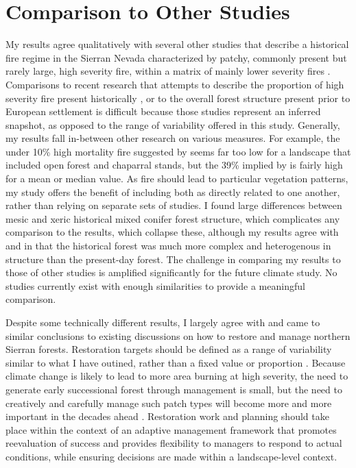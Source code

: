 \section{Comparison to Other Studies}

My results agree qualitatively with several other studies that describe a historical fire regime in the Sierran Nevada characterized by patchy, commonly present but rarely large, high severity fire, within a matrix of mainly lower severity fires \citep{Keeley2000,Hessburg2005,Collins2010,Baker2014}. Comparisons to recent research that attempts to describe the proportion of high severity fire present historically \citep{Mallek2013}, or to the overall forest structure present prior to European settlement \citep{Stephens2015,Baker2014} is difficult because those studies represent an inferred snapshot, as opposed to the range of variability offered in this study. Generally, my results fall in-between other research on various measures. For example, the under 10\% high mortality fire suggested by \citet{Mallek2013} seems far too low for a landscape that included open forest and chaparral stands, but the 39\% implied by \citet{Baker2014} is fairly high for a mean or median value. As fire should lead to particular vegetation patterns, my study offers the benefit of including both as directly related to one another, rather than relying on separate sets of studies. I found large differences between mesic and xeric historical mixed conifer forest structure, which complicates any comparison to the \citet{Baker2014} results, which collapse these, although my results agree with \citet{Baker2014} and \citet{Collins2010} in that the historical forest was much more complex and heterogenous in structure than the present-day forest. The challenge in comparing my results to those of other studies is amplified significantly for the future climate study. No studies currently exist with enough similarities to provide a meaningful comparison.

Despite some technically different results, I largely agree with and came to similar conclusions to existing discussions on how to restore and manage northern Sierran forests. Restoration targets should be defined as a range of variability similar to what I have outined, rather than a fixed value or proportion \citep{Collins2011}. Because climate change is likely to lead to more area burning at high severity, the need to generate early successional forest through management is small, but the need to creatively and carefully manage such patch types will become more and more important in the decades ahead \citep{Collins2010,Littell2012}. Restoration work and planning should take place within the context of an adaptive management framework that promotes reevaluation of success and provides flexibility to managers to respond to actual conditions, while ensuring decisions are made within a landscape-level context.


